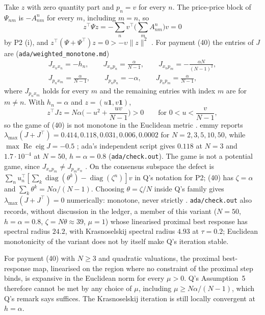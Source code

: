 \documentclass{article}
\begin{document}
Take \(z\) with zero quantity part and \(p_n=v\) for every \(n\). The price-price block of \(\Psi_{nm}\) is \(-A^n_{nm}\) for every \(m\), including \(m=n\), so
\[
z^\top\Psi z=-\sum_nv^\top\Big(\sum_mA^n_{nm}\Big)v=0
\]
by P2 (i), and \(z^\top(\Psi+\Psi^\top)z=0>-\upsilon\|z\|^2\) . For payment (40) the entries of \(J\) are  (\texttt{ada/weighted\_monotone.md})
\begin{gather*}
J_{x_nx_n}=-h_n,\qquad J_{x_np_n}=\frac{\alpha}{N-1},\qquad J_{x_np_m}=-\frac{\alpha N}{(N-1)^2},\\
J_{p_nx_m}=\frac{\alpha}{N-1},\qquad J_{p_np_n}=-\alpha,\qquad J_{p_np_m}=\frac{\alpha}{N-1},
\end{gather*}
where \(J_{p_nx_m}\) holds for every \(m\) and the remaining entries with index \(m\) are for \(m\neq n\). With \(h_n=\alpha\) and \(z=(u\mathbf 1,v\mathbf 1)\),
\[
z^\top Jz=N\alpha\Big(-u^2+\frac{uv}{N-1}\Big)>0\qquad\text{for }0<u<\frac{v}{N-1},
\]
so the game of (40) is not monotone in the Euclidean metric . emmy reports \(\lambda_{\max}(J+J^\top)=0.414,0.118,0.031,0.006,0.0002\) for \(N=2,3,5,10,50\), while \(\max\operatorname{Re}\operatorname{eig}J=-0.5\) ; ada's independent script gives \(0.118\) at \(N=3\) and \(1.7\cdot10^{-4}\) at \(N=50\), \(h=\alpha=0.8\) (\texttt{ada/check.out}). The game is not a potential game, since \(J_{x_np_m}\neq J_{p_mx_n}\) . On the consensus subspace the defect is \(\sum_nu_n^\top[\sum_k\operatorname{diag}(\theta^k)-\operatorname{diag}(\zeta^n)]v\) in Q's notation for P2; (40) has \(\zeta=\alpha\) and \(\sum_k\theta^k=N\alpha/(N-1)\). Choosing \(\theta=\zeta/N\) inside Q's family gives \(\lambda_{\max}(J+J^\top)=0\) numerically: monotone, never strictly . \texttt{ada/check.out} also records, without discussion in the ledger, a member of this variant (\(N=50\), \(h=\alpha=0.8\), \(\zeta=N\theta\approx39\), \(\mu=1\)) whose linearised proximal best response has spectral radius \(24.2\), with Krasnoselskij spectral radius \(4.93\) at \(\tau=0.2\); Euclidean monotonicity of the variant does not by itself make Q's iteration stable.

\begin{claim}
For payment (40) with \(N\ge3\) and quadratic valuations, the proximal best-response map, linearised on the region where no constraint of the proximal step binds, is expansive in the Euclidean norm for every \(\mu>0\). Q's Assumption~5 therefore cannot be met by any choice of \(\mu\), including \(\mu\ge N\alpha/(N-1)\), which Q's remark says suffices. The Krasnoselskij iteration is still locally convergent at \(h=\alpha\). 
\end{claim}
\end{document}
